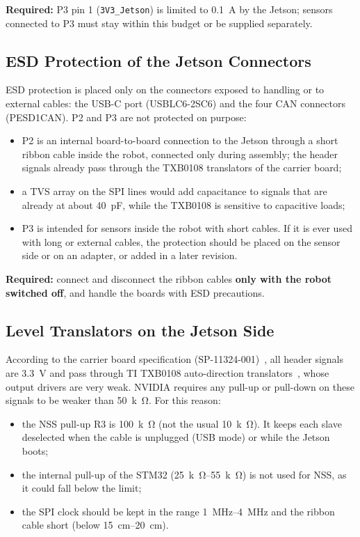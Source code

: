 \documentclass[11pt,a4paper]{article}
\newcommand{\required}[1]{\begin{reqbox}\textbf{\color{reqred}Required:} #1\end{reqbox}}
\newcommand{\net}[1]{\texttt{#1}}
\begin{document}
\required{P3 pin 1 (\net{3V3\_Jetson}) is limited to \qty{0.1}{A} by the Jetson; sensors connected to
P3 must stay within this budget or be supplied separately.}

\subsection{ESD Protection of the Jetson Connectors}\label{sec:esdjetson}

ESD protection is placed only on the connectors exposed to handling or to external cables: the
USB-C port (USBLC6-2SC6) and the four CAN connectors (PESD1CAN). P2 and P3 are not
protected on purpose:
\begin{itemize}
    \item P2 is an internal board-to-board connection to the Jetson through a short ribbon cable
    inside the robot, connected only during assembly; the header signals already pass through
    the TXB0108 translators of the carrier board;
    \item a TVS array on the SPI lines would add capacitance to signals that are already at about
    \qty{40}{pF}, while the TXB0108 is sensitive to capacitive loads;
    \item P3 is intended for sensors inside the robot with short cables. If it is ever used with long
    or external cables, the protection should be placed on the sensor side or on an adapter, or
    added in a later revision.
\end{itemize}

\required{connect and disconnect the ribbon cables \textbf{only with the robot switched off},
and handle the boards with ESD precautions.}

\subsection{Level Translators on the Jetson Side}\label{sec:txb}

According to the carrier board specification (SP-11324-001)~\cite{jetson}, all header signals are \qty{3.3}{V} and
pass through TI TXB0108 auto-direction translators~\cite{txb}, whose output drivers are very weak.
NVIDIA requires any pull-up or pull-down on these signals to be weaker than \qty{50}{k\ohm}. For this
reason:
\begin{itemize}
    \item the NSS pull-up R3 is \qty{100}{k\ohm} (not the usual \qty{10}{k\ohm}). It keeps each slave deselected when
    the cable is unplugged (USB mode) or while the Jetson boots;
    \item the internal pull-up of the STM32 (\qtyrange{25}{55}{k\ohm}) is not used for NSS, as it could fall
    below the limit;
    \item the SPI clock should be kept in the range \qtyrange{1}{4}{MHz} and the ribbon cable short
    (below \qtyrange{15}{20}{cm}).
\end{itemize}
\end{document}
